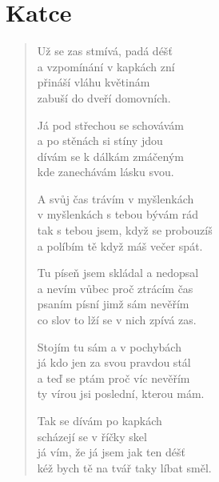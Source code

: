 \section{Katce}

\begin{verse}
Už se zas stmívá, padá déšť \\
a vzpomínání v kapkách zní \\
přináší vláhu květinám \\
zabuší do dveří domovních.

Já pod střechou se schovávám \\
a po stěnách si stíny jdou \\
dívám se k dálkám zmáčeným \\
kde zanechávám lásku svou.

A svůj čas trávím v myšlenkách \\
v myšlenkách s tebou bývám rád \\
tak s tebou jsem, když se probouzíš \\
a políbím tě když máš večer spát.

Tu píseň jsem skládal a nedopsal \\
a nevím vůbec proč ztrácím čas \\
psaním písní jimž sám nevěřím \\
co slov to lží se v nich zpívá zas.

Stojím tu sám a v pochybách \\
já kdo jen za svou pravdou stál \\
a teď se ptám proč víc nevěřím \\
ty vírou jsi poslední, kterou mám.

Tak se dívám po kapkách \\
scházejí se v říčky skel \\
já vím, že já jsem jak ten déšť \\
kéž bych tě na tvář taky líbat směl.



\end{verse}
